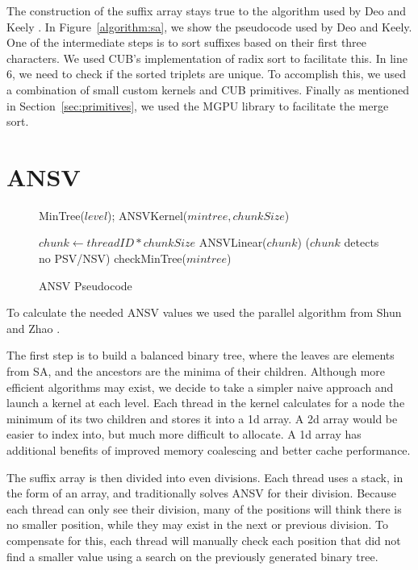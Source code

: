 The construction of the suffix array stays true to the algorithm used by Deo and Keely \cite{Deo}.
In Figure~\ref{algorithm:sa}, we show the pseudocode used by Deo and Keely.
One of the intermediate steps is to sort suffixes based on their first three characters.
We used CUB's implementation of radix sort to facilitate this.
In line 6, we need to check if the sorted triplets are unique.
To accomplish this, we used a combination of small custom kernels and CUB primitives.
Finally as mentioned in Section~\ref{sec:primitives}, we used the MGPU library to facilitate the merge sort.

\section{ANSV}

\begin{figure}
\begin{algorithmic}[1]
\State MinTree($level$);
\EndFor
\State ANSVKernel($mintree,chunkSize$)
\EndProcedure
\end{algorithmic}
\begin{algorithmic}[1]
\State $chunk \gets threadID * chunkSize$
\State ANSVLinear($chunk$)
\If($chunk$ detects no PSV/NSV)
\State checkMinTree($mintree$)
\EndIf
\EndProcedure
\end{algorithmic}
\caption{ANSV Pseudocode}
\label{algorithm:ansv}
\end{figure}

To calculate the needed ANSV values we used the parallel algorithm from Shun and Zhao \cite{shun2013practical}.

The first step is to build a balanced binary tree, where the leaves are elements from SA, and the ancestors are the minima of their children.
Although more efficient algorithms may exist, we decide to take a simpler naive approach and launch a kernel at each level.
Each thread in the kernel calculates for a node the minimum of its two children and stores it into a 1d array.
A 2d array would be easier to index into, but much more difficult to allocate.
A 1d array has additional benefits of improved memory coalescing and better cache performance.

The suffix array is then divided into even divisions.
Each thread uses a stack, in the form of an array, and traditionally solves ANSV for their division.
Because each thread can only see their division, many of the positions will think there is no smaller position, while they may exist in the next or previous division.
To compensate for this, each thread will manually check each position that did not find a smaller value using a search on the previously generated binary tree.

